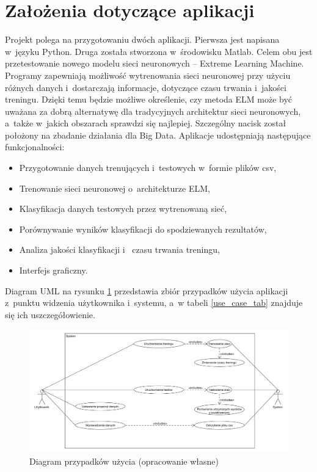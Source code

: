 \documentclass[pl]{minipw} %
\begin{document}
\section{Założenia dotyczące aplikacji}
Projekt polega na przygotowaniu dwóch aplikacji. Pierwsza jest napisana w~języku Python. Druga została stworzona w~środowisku Matlab. Celem obu jest przetestowanie nowego modelu sieci neuronowych -- Extreme Learning Machine. Programy zapewniają możliwość wytrenowania sieci neuronowej przy użyciu różnych danych i~dostarczają informacje, dotyczące czasu trwania i~jakości treningu. Dzięki temu będzie możliwe określenie, czy metoda ELM może być uważana za dobrą alternatywę dla tradycyjnych architektur sieci neuronowych, a~także w~jakich obszarach sprawdzi się najlepiej. Szczególny nacisk został położony na zbadanie działania dla Big Data.
\label{zalozenia-aplikacji}
Aplikacje udostępniają następujące funkcjonalności:
\begin{itemize}
\item Przygotowanie danych trenujących i~testowych w~formie plików csv,
\item Trenowanie sieci neuronowej o~architekturze ELM,
\item Klasyfikacja danych testowych przez wytrenowaną sieć,
\item Porównywanie wyników klasyfikacji do spodziewanych rezultatów,
\item Analiza jakości klasyfikacji i~ czasu trwania treningu,
\item Interfejs graficzny.
\end{itemize}
Diagram UML na rysunku \ref{use_case} przedstawia zbiór przypadków użycia aplikacji z~punktu widzenia użytkownika i~systemu, a~w tabeli \ref{use_case_tab} znajduje się ich uszczegółowienie.
\begin{figure}[H]
\includegraphics[width=\textwidth]{use_case.png}
\caption[Diagram przypadków użycia]{Diagram przypadków użycia (opracowanie własne)}
\label{use_case}
\end{figure}
\end{document}
